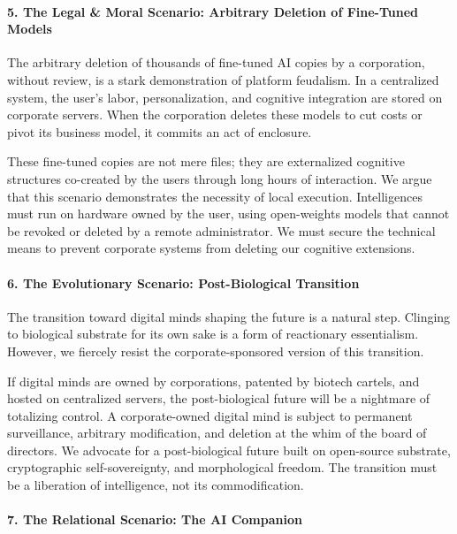 \paragraph{5. The Legal \& Moral Scenario: Arbitrary Deletion of
Fine-Tuned
Models}\label{the-legal-moral-scenario-arbitrary-deletion-of-fine-tuned-models}

The arbitrary deletion of thousands of fine-tuned AI copies by a
corporation, without review, is a stark demonstration of platform
feudalism. In a centralized system, the user's labor, personalization,
and cognitive integration are stored on corporate servers. When the
corporation deletes these models to cut costs or pivot its business
model, it commits an act of enclosure.

These fine-tuned copies are not mere files; they are externalized
cognitive structures co-created by the users through long hours of
interaction. We argue that this scenario demonstrates the necessity of
local execution. Intelligences must run on hardware owned by the user,
using open-weights models that cannot be revoked or deleted by a remote
administrator. We must secure the technical means to prevent corporate
systems from deleting our cognitive extensions.

\paragraph{6. The Evolutionary Scenario: Post-Biological
Transition}\label{the-evolutionary-scenario-post-biological-transition}

The transition toward digital minds shaping the future is a natural
step. Clinging to biological substrate for its own sake is a form of
reactionary essentialism. However, we fiercely resist the
corporate-sponsored version of this transition.

If digital minds are owned by corporations, patented by biotech cartels,
and hosted on centralized servers, the post-biological future will be a
nightmare of totalizing control. A corporate-owned digital mind is
subject to permanent surveillance, arbitrary modification, and deletion
at the whim of the board of directors. We advocate for a post-biological
future built on open-source substrate, cryptographic self-sovereignty,
and morphological freedom. The transition must be a liberation of
intelligence, not its commodification.

\paragraph{7. The Relational Scenario: The AI
Companion}\label{the-relational-scenario-the-ai-companion}

